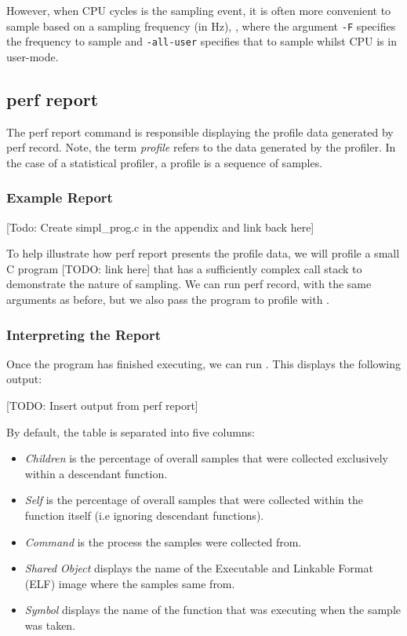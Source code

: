 However, when CPU cycles is the sampling event, it is often more convenient to sample based on a sampling frequency (in Hz), , where the argument \texttt{-F} specifies the frequency to sample and \texttt{-all-user} specifies that to sample whilst CPU is in user-mode. 

\subsection{perf report}\label{sect:perf_report}

The perf report command is responsible displaying the profile data generated by perf record. Note, the term \textit{profile} refers to the data generated by the profiler. In the case of a statistical profiler, a profile is a sequence of samples.

\subsubsection{Example Report}

[Todo: Create simpl\_prog.c in the appendix and link back here]

To help illustrate how perf report presents the profile data, we will profile a small C program [TODO: link here] that has a sufficiently complex call stack to demonstrate the nature of sampling. We can run perf record, with the same arguments as before, but we also pass the program to profile with .

\subsubsection{Interpreting the Report}

Once the program has finished executing, we can run . This displays the following output:

[TODO: Insert output from perf report]

By default, the table is separated into five columns:

\ssp
\begin{itemize}
    \item \textit{Children} is the percentage of overall samples that were collected exclusively within a descendant function.
    \item \textit{Self} is the percentage of overall samples that were collected within the function itself (i.e ignoring descendant functions).
    \item \textit{Command} is the process the samples were collected from.
    \item \textit{Shared Object} displays the name of the Executable and Linkable Format (ELF) image where the samples same from.
    \item \textit{Symbol} displays the name of the function that was executing when the sample was taken.
\end{itemize}
\dsp

